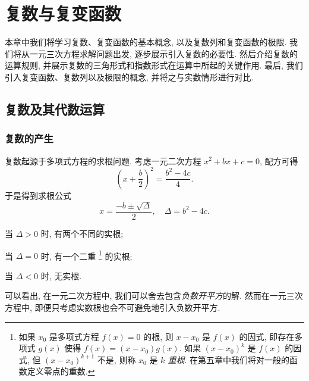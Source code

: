 
\chapter{复数与复变函数}
\label{chapter:1}

\begin{introduction}
  

  本章中我们将学习复数、复变函数的基本概念, 以及复数列和复变函数的极限.
  我们将从一元三次方程求解问题出发, 逐步展示引入复数的必要性. 然后介绍复数的运算规则, 并展示复数的三角形式和指数形式在运算中所起的关键作用. 最后, 我们引入复变函数、复数列以及极限的概念, 并将之与实数情形进行对比.
\end{introduction}


\section{复数及其代数运算}

\subsection{复数的产生}

复数起源于多项式方程的求根问题. 
考虑一元二次方程 $x^2+bx+c=0$, 配方可得
  \[\left(x+\frac b2\right)^2=\frac{b^2-4c}4.\]
于是得到求根公式
  \[x=\frac{-b\pm\sqrt\Delta}2,\quad \Delta=b^2-4c.\]
\begin{enumpar}
  \item 当 $\Delta>0$ 时, 有两个不同的实根;
  \item 当 $\Delta=0$ 时, 有一个二重%
    \footnote{%
      如果 $x_0$ 是多项式方程 $f(x)=0$ 的根, 则 $x-x_0$ 是 $f(x)$ 的因式, 即存在多项式 $g(x)$ 使得 $f(x)=(x-x_0)g(x)$.
      如果 $(x-x_0)^k$ 是 $f(x)$ 的因式, 但 $(x-x_0)^{k+1}$ 不是, 则称 $x_0$ 是 \emph{$k$ 重根}.
      在第五章中我们将对一般的函数定义零点的重数.
    }%
    的实根;
  \item 当 $\Delta<0$ 时, 无实根.
\end{enumpar}

可以看出, 在一元二次方程中, 我们可以舍去包含\emph{负数开平方}的解. 然而在一元三次方程中, 即便只考虑实数根也会不可避免地引入负数开平方.

